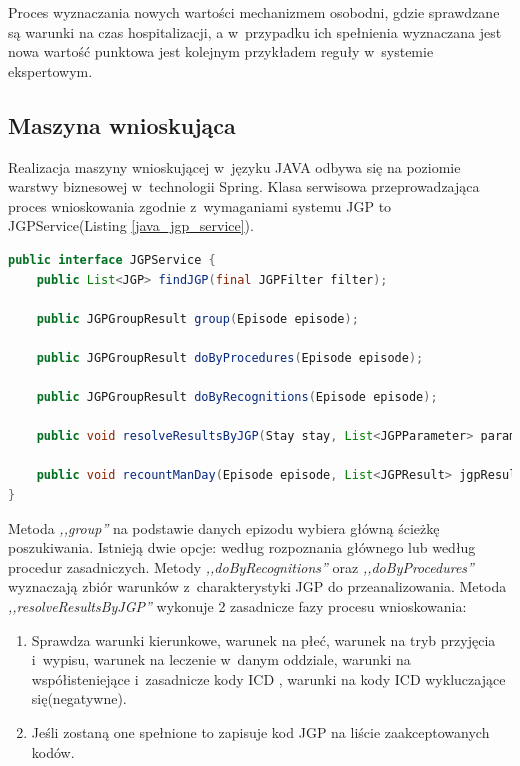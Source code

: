 Proces wyznaczania nowych wartości mechanizmem osobodni, gdzie sprawdzane są warunki na czas hospitalizacji, a w~przypadku ich spełnienia wyznaczana jest nowa wartość punktowa jest kolejnym przykładem reguły w~systemie ekspertowym.

\subsection{Maszyna wnioskująca}
\label{sec:maszynaWnioskujaca}
Realizacja maszyny wnioskującej w~języku JAVA odbywa się na poziomie warstwy biznesowej w~technologii Spring. Klasa serwisowa przeprowadzająca proces wnioskowania zgodnie z~wymaganiami systemu JGP to JGPService(Listing \ref{java_jgp_service}).

\begin{lstlisting}[language=Java,caption={Serwis JGP - realizacja maszyny wnioskującej.},label=java_jgp_service]
public interface JGPService {
    public List<JGP> findJGP(final JGPFilter filter);

    public JGPGroupResult group(Episode episode);

    public JGPGroupResult doByProcedures(Episode episode);

    public JGPGroupResult doByRecognitions(Episode episode);

    public void resolveResultsByJGP(Stay stay, List<JGPParameter> parameters, JGPGroupResult jgpGroupResult);

    public void recountManDay(Episode episode, List<JGPResult> jgpResultList);
}
\end{lstlisting}

Metoda \textit{,,group''} na podstawie danych epizodu wybiera główną ścieżkę poszukiwania. Istnieją dwie opcje: według rozpoznania głównego lub według procedur zasadniczych. Metody \textit{,,doByRecognitions''} oraz \textit{,,doByProcedures''} wyznaczają zbiór warunków z~charakterystyki JGP do przeanalizowania. Metoda \textit{,,resolveResultsByJGP''} wykonuje 2 zasadnicze fazy procesu wnioskowania:
\begin{enumerate}\itemsep1pt
 \item Sprawdza warunki kierunkowe, warunek na płeć, warunek na tryb przyjęcia i~wypisu, warunek na leczenie w~danym oddziale, warunki na współisteniejące i~zasadnicze kody ICD , warunki na kody ICD wykluczające się(negatywne).
 \item Jeśli zostaną one spełnione to zapisuje kod JGP na liście zaakceptowanych kodów.
\end{enumerate}

